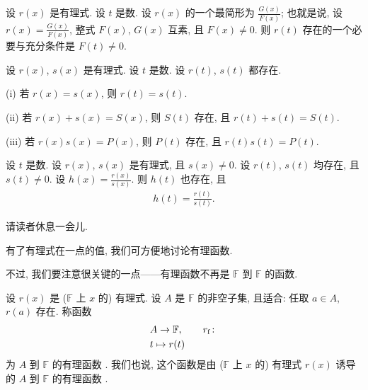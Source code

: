 \begin{proposition}
    设 $r(x)$ 是有理式. 设 $t$ 是数. 设 $r(x)$ 的一个最简形为 $\frac{G(x)}{F(x)}$; 也就是说, 设 $r(x) = \frac{G(x)}{F(x)}$, 整式 $F(x)$, $G(x)$ 互素, 且 $F(x) \neq 0$. 则 $r(t)$ 存在的一个必要与充分条件是 $F(t) \neq 0$.
\end{proposition}

\begin{proposition}
    设 $r(x)$, $s(x)$ 是有理式. 设 $t$ 是数. 设 $r(t)$, $s(t)$ 都存在.

    (i) 若 $r(x) = s(x)$, 则 $r(t) = s(t)$.

    (ii) 若 $r(x) + s(x) = S(x)$, 则 $S(t)$ 存在, 且 $r(t) + s(t) = S(t)$.

    (iii) 若 $r(x) s(x) = P(x)$, 则 $P(t)$ 存在, 且 $r(t) s(t) = P(t)$.
\end{proposition}

\begin{proposition}
    设 $t$ 是数. 设 $r(x)$, $s(x)$ 是有理式, 且 $s(x) \neq 0$. 设 $r(t)$, $s(t)$ 均存在, 且 $s(t) \neq 0$. 设 $h(x) = \frac{r(x)}{s(x)}$. 则 $h(t)$ 也存在, 且
    \begin{align*}
        h(t) = \frac{r(t)}{s(t)}.
    \end{align*}
\end{proposition}

请读者休息一会{\scriptsize 儿}.

\myLine

有了有理式在一点的值, 我们可方便地讨论有理函数.

不过, 我们要注意很关键的一点——有理函数不再是 $\mathbb{F}$ 到 $\mathbb{F}$ 的函数.

\begin{definition}
    设 $r(x)$ 是 ($\mathbb{F}$ 上 $x$ 的) 有理式. 设 $A$ 是 $\mathbb{F}$ 的非空子集, 且适合: 任取 $a \in A$, $r(a)$ 存在. 称函数
    \begin{align*}
         & A \to \mathbb{F}, \tag*{$r_\mathrm{f} \colon$} \\
         & t \mapsto r(t)
    \end{align*}
    为 $A$ 到 $\mathbb{F}$ 的有理函数 . 我们也说, 这个函数是由 ($\mathbb{F}$ 上 $x$ 的) 有理式 $r(x)$ 诱导的 $A$ 到 $\mathbb{F}$ 的有理函数 .
\end{definition}

